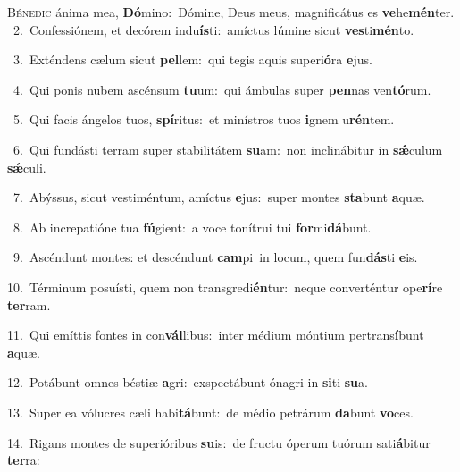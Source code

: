 \lettrine{\initial\textcolor{\initialcolor}{B}}{énedic} ánima mea, \textbf{Dó}\-mino:~\star Dómine, Deus meus, magnificátus es \textbf{ve}\-he\-\textbf{mén}\-ter.\\
{\numbfont\textcolor{\numbcolor}{~2.}}~Confessiónem, et decórem indu\-\textbf{ís}\-ti:~\star amíctus lúmine sicut \textbf{ves}\-ti\-\textbf{mén}\-to.\par
{\numbfont\textcolor{\numbcolor}{~3.}}~Exténdens cælum sicut \textbf{pel}\-lem:~\star qui tegis aquis superi\-\textbf{ó}\-ra \textbf{e}\-jus.\par
{\numbfont\textcolor{\numbcolor}{~4.}}~Qui ponis nubem ascénsum \textbf{tu}\-um:~\star qui ámbulas super \textbf{pen}\-nas ven\-\textbf{tó}\-rum.\par
{\numbfont\textcolor{\numbcolor}{~5.}}~Qui facis ángelos tuos, \textbf{spí}\-ritus:~\star et minístros tuos \textbf{i}\-gnem u\-\textbf{rén}\-tem.\par
{\numbfont\textcolor{\numbcolor}{~6.}}~Qui fundásti terram super stabilitátem \textbf{su}\-am:~\star non inclinábitur in \textbf{sǽ}\-culum \textbf{sǽ}\-culi.\par
{\numbfont\textcolor{\numbcolor}{~7.}}~Abýssus, sicut vestiméntum, amíctus \textbf{e}\-jus:~\star super montes \textbf{sta}\-bunt \textbf{a}\-quæ.\par
{\numbfont\textcolor{\numbcolor}{~8.}}~Ab increpatióne tua \textbf{fú}\-gient:~\star a voce tonítrui tui \textbf{for}\-mi\-\textbf{dá}\-bunt.\par
{\numbfont\textcolor{\numbcolor}{~9.}}~Ascéndunt montes: et descéndunt \textbf{cam}\-pi~\star in locum, quem fun\-\textbf{dás}\-ti \textbf{e}\-is.\par
{\numbfont\textcolor{\numbcolor}{10.}}~Términum posuísti, quem non transgredi\-\textbf{én}\-tur:~\star neque converténtur ope\-\textbf{rí}\-re \textbf{ter}\-ram.\par
{\numbfont\textcolor{\numbcolor}{11.}}~Qui emíttis fontes in con\-\textbf{vál}\-libus:~\star inter médium móntium pertrans\-\textbf{í}\-bunt \textbf{a}\-quæ.\par
{\numbfont\textcolor{\numbcolor}{12.}}~Potábunt omnes béstiæ \textbf{a}\-gri:~\star exspectábunt ónagri in \textbf{si}\-ti \textbf{su}\-a.\par
{\numbfont\textcolor{\numbcolor}{13.}}~Super ea vólucres cæli habi\-\textbf{tá}\-bunt:~\star de médio petrárum \textbf{da}\-bunt \textbf{vo}\-ces.\par
{\numbfont\textcolor{\numbcolor}{14.}}~Rigans montes de superióribus \textbf{su}\-is:~\star de fructu óperum tuórum sati\-\textbf{á}\-bitur \textbf{ter}\-ra:\par
